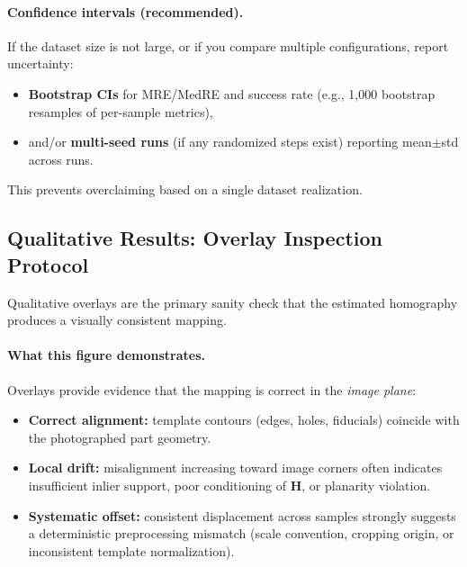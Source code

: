 \paragraph{Confidence intervals (recommended).}
If the dataset size is not large, or if you compare multiple configurations, report uncertainty:
\begin{itemize}
  \item \textbf{Bootstrap CIs} for MRE/MedRE and success rate (e.g., 1{,}000 bootstrap resamples of per-sample metrics),
  \item and/or \textbf{multi-seed runs} (if any randomized steps exist) reporting mean$\pm$std across runs.
\end{itemize}
This prevents overclaiming based on a single dataset realization.

\subsection{Qualitative Results: Overlay Inspection Protocol}
Qualitative overlays are the primary sanity check that the estimated homography produces a visually consistent mapping.


\paragraph{What this figure demonstrates.}
Overlays provide evidence that the mapping is correct in the \emph{image plane}:
\begin{itemize}
  \item \textbf{Correct alignment:} template contours (edges, holes, fiducials) coincide with the photographed part geometry.
  \item \textbf{Local drift:} misalignment increasing toward image corners often indicates insufficient inlier support, poor conditioning of $\mathbf{H}$, or planarity violation.
  \item \textbf{Systematic offset:} consistent displacement across samples strongly suggests a deterministic preprocessing mismatch (scale convention, cropping origin, or inconsistent template normalization).
\end{itemize}

